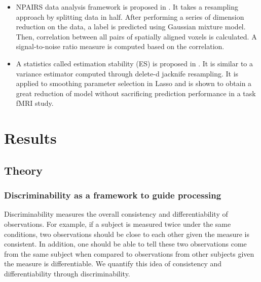 \documentclass{article}
\begin{document}
\begin{itemize}
	\item NPAIRS data analysis framework is proposed in \cite{strother2002quantitative}. It takes a resampling approach by splitting data in half. After performing a series of dimension reduction on the data, a label is predicted using Gaussian mixture model. Then, correlation between 
	all pairs of spatially aligned voxels is calculated. A signal-to-noise ratio measure is computed based on the correlation.
	\item A statistics called estimation stability (ES) is proposed in \cite{yu2013stability}. It is similar to a variance estimator computed through delete-d jacknife resampling. It is applied to smoothing parameter selection in Lasso and is shown to obtain a great reduction of model without sacrificing prediction performance in a task fMRI study.
\end{itemize}


\section{Results}
\subsection{Theory}

\subsubsection{Discriminability as a framework to guide processing}
Discriminability measures the overall consistency and differentiability of observations. For example, if a subject is measured twice under the same conditions, two observations should be close to each other given the measure is consistent. In addition, one should be able to tell these two observations come from the same subject when compared to observations from other subjects given the measure is differentiable. We quantify this idea of consistency and differentiability through discriminability. 
\end{document}
